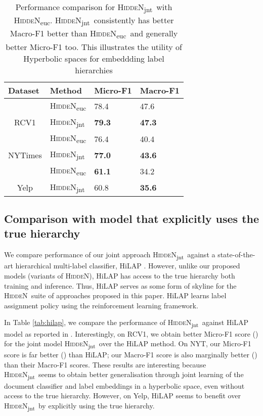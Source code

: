 \documentclass[11pt,a4paper]{article}
\newcommand{\model}{\mbox{\textsc{HiddeN}}}
\newcommand{\modeljnt}{\mbox{\textsc{HiddeN}\textsubscript{jnt}}}
\newcommand{\modeleuc}{\mbox{\textsc{HiddeN}\textsubscript{euc}}}
\begin{document}
\begin{table}[!h]
\centering
\caption{Performance comparison for \modeljnt\ with \modeleuc. \modeljnt\ consistently has better Macro-F1 better than \modeleuc\ and generally better Micro-F1 too. This illustrates the utility of Hyperbolic spaces for embeddding label hierarchies}
\label{tab:main-eucjnt}
\begin{adjustbox}{max width=0.48\textwidth}
\begin{tabular}{llll} 
\toprule
\multicolumn{1}{l}{Dataset} & Method & Micro-F1 & Macro-F1 \\ 
\toprule
& \modeleuc & 78.4 & 47.6 \\
\multicolumn{1}{c}{RCV1}
& \modeljnt & \textbf{79.3} & \textbf{47.3} \\
\hline\hline
& \modeleuc & 76.4 & 40.4 \\
\multicolumn{1}{c}{NYTimes}
 & {\modeljnt}& \textbf{77.0} & \textbf{43.6} \\
\hline\hline
& \modeleuc & \textbf{61.1}& 34.2\\
\multicolumn{1}{c}{Yelp} 
& {\modeljnt} & 60.8 & \textbf{35.6} \\
\bottomrule
\end{tabular}
\end{adjustbox}
\end{table}

\subsection{Comparison with model that explicitly uses the true hierarchy}
We compare performance of our joint approach \modeljnt\ against a state-of-the-art hierarchical multi-label classifier, HiLAP \citep{emnlp}. However, unlike our proposed models (variants of \model), HiLAP has access to the true hierarchy both training and inference. Thus, HiLAP serves as some form of skyline for the \model\ suite of approaches proposed in this paper. HiLAP learns label assignment policy using the reinforcement learning framework. 

In Table \ref{tab:hilap}, we compare the performance of \modeljnt\ against HiLAP model as reported in \citet{emnlp}. Interestingly, on RCV1, we obtain better Micro-F1 score () for the joint model \modeljnt\ over the HiLAP method. On NYT, our Micro-F1 score is far better () than HiLAP; our Macro-F1 score is also marginally better () than their Macro-F1 scores. These results are interesting because \modeljnt\ seems to obtain better generalisation through joint learning of the document classifier and label embeddings in a hyperbolic space, even without access to the true hierarchy. However, on Yelp, HiLAP seems to benefit over \modeljnt\ by explicitly using the true hierarchy.
\end{document}
